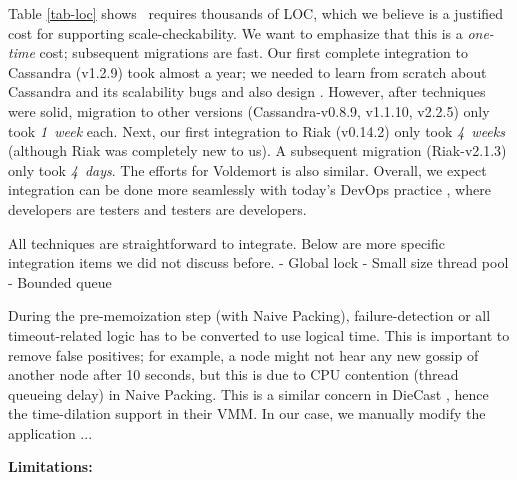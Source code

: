 %
Table \ref{tab-loc} shows \sck\ requires thousands of LOC, which we
believe is a justified cost for supporting scale-checkability.  We want to
emphasize that this is a {\em one-time} cost; subsequent migrations are
fast.  Our first complete integration to Cassandra (v1.2.9) took almost a
year; we needed to learn from scratch about Cassandra and its scalability
bugs and also design \sck.  However, after \sck techniques were solid,
migration to other versions (Cassandra-v0.8.9, v1.1.10, v2.2.5) only took
{\em 1~week} each.  Next, our first integration to Riak (v0.14.2) only
took {\em 4~weeks} (although Riak was completely new to us).  A subsequent
migration (Riak-v2.1.3) only took {\em 4~days}.  The efforts for
Voldemort is also similar.
%
Overall, we expect \sck integration can be done more seamlessly with
today's DevOps practice \cite{Limoncelli+11-Devops}, where developers are
testers and testers are developers.







All \sck techniques are straightforward to integrate.  Below are more
specific integration items we did not discuss before.
- Global lock
- Small size thread pool
- Bounded queue
\fi

 During the pre-memoization step (with Naive
Packing), failure-detection or all timeout-related logic has to be
converted to use logical time.  This is important to remove false
positives; for example, a node might not hear any new gossip of another
node after 10 seconds, but this is due to CPU contention (thread queueing
delay) in Naive Packing.  This is a similar concern in DieCast \cite{x},
hence the time-dilation support in their VMM.  In our case, we manually
modify the application ... 
\fi









{\bf Limitations:}
\fi


